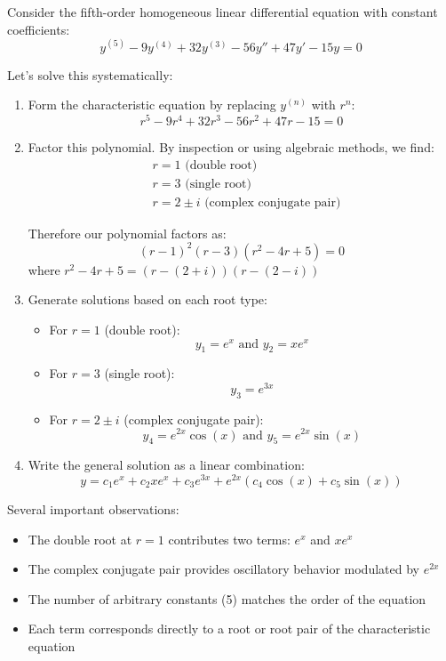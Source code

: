 \begin{example}
Consider the fifth-order homogeneous linear differential equation with constant coefficients:
\[
y^{(5)} - 9y^{(4)} + 32y^{(3)} - 56y'' + 47y' - 15y = 0
\]

\begin{solution}
Let's solve this systematically:

\begin{enumerate}
\item Form the characteristic equation by replacing $y^{(n)}$ with $r^n$:
   \[
   r^5 - 9r^4 + 32r^3 - 56r^2 + 47r - 15 = 0
   \]

\item Factor this polynomial. By inspection or using algebraic methods, we find:
   \begin{align*}
   &r = 1 \text{ (double root)} \\
   &r = 3 \text{ (single root)} \\
   &r = 2 \pm i \text{ (complex conjugate pair)}
   \end{align*}
   
   Therefore our polynomial factors as:
   \[
   (r - 1)^2(r - 3)(r^2 - 4r + 5) = 0
   \]
   where $r^2 - 4r + 5 = (r - (2+i))(r - (2-i))$

\item Generate solutions based on each root type:
   \begin{itemize}
      \item For $r = 1$ (double root): 
         \[
         y_1 = e^x \text{ and } y_2 = xe^x
         \]
      
      \item For $r = 3$ (single root):
         \[
         y_3 = e^{3x}
         \]
      
      \item For $r = 2 \pm i$ (complex conjugate pair):
         \[
         y_4 = e^{2x}\cos(x) \text{ and } y_5 = e^{2x}\sin(x)
         \]
   \end{itemize}

\item Write the general solution as a linear combination:
   \[
   y = c_1e^x + c_2xe^x + c_3e^{3x} + e^{2x}(c_4\cos(x) + c_5\sin(x))
   \]
\end{enumerate}

\noindent Several important observations:
\begin{itemize}
   \item The double root at $r = 1$ contributes two terms: $e^x$ and $xe^x$
   \item The complex conjugate pair provides oscillatory behavior modulated by $e^{2x}$
   \item The number of arbitrary constants (5) matches the order of the equation
   \item Each term corresponds directly to a root or root pair of the characteristic equation
\end{itemize}
\end{solution}
\end{example}
\exampleline

